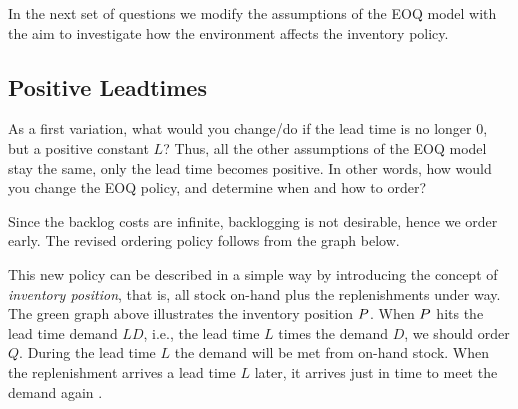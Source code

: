 In the next set of questions we modify the assumptions of the EOQ model with the aim to investigate how the environment affects the inventory policy.



\subsection{Positive Leadtimes}
\label{sec:variations}


\begin{exercise}\label{ex:7}
  As a first variation, what would you change/do if the lead time
  is no longer 0, but a positive constant  $L$? Thus, all the other
  assumptions of the EOQ model stay the same, only the lead time
  becomes positive.  In other words, how would you change the EOQ
  policy, and determine when and how to order?

  \begin{solution}
    Since the backlog costs are infinite, backlogging is not
    desirable, hence we order early. The revised ordering policy follows from the graph below.
\begin{center}
\end{center}
    
This new policy can be described in a simple way by introducing the
concept of \emph{inventory position}, that is, all stock on-hand plus
the replenishments under way. The green graph above illustrates the
inventory position $P$. When $P$ hits the lead time demand $L D$,
i.e., the lead time $L$ times the demand $D$, we should order
$Q$. During the lead time $L$ the demand will be met from on-hand
stock. When the replenishment arrives a lead time $L$ later, it
arrives just in time to meet the demand again .


\end{solution}
\end{exercise}
